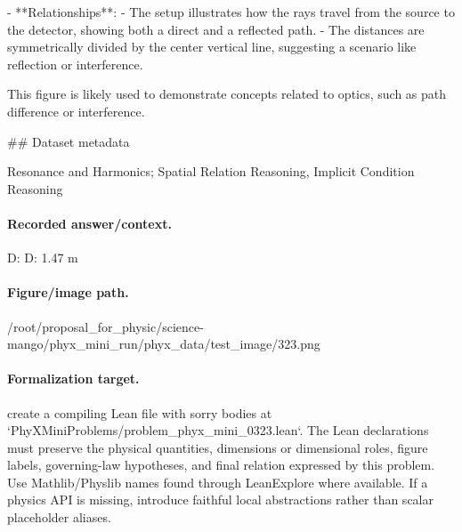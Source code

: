 - **Relationships**:
  - The setup illustrates how the rays travel from the source to the detector, showing both a direct and a reflected path.
  - The distances are symmetrically divided by the center vertical line, suggesting a scenario like reflection or interference.

This figure is likely used to demonstrate concepts related to optics, such as path difference or interference.

\#\# Dataset metadata

Resonance and Harmonics; Spatial Relation Reasoning, Implicit Condition Reasoning

\paragraph{Recorded answer/context.}
D: D: 1.47 m

\paragraph{Figure/image path.}
/root/proposal\_for\_physic/science-mango/phyx\_mini\_run/phyx\_data/test\_image/323.png

\paragraph{Formalization target.}
create a compiling Lean file with sorry bodies at `PhyXMiniProblems/problem\_phyx\_mini\_0323.lean`. The Lean declarations must preserve the physical quantities, dimensions or dimensional roles, figure labels, governing-law hypotheses, and final relation expressed by this problem.
Use Mathlib/Physlib names found through LeanExplore where available. If a physics API is missing, introduce faithful local abstractions rather than scalar placeholder aliases.

